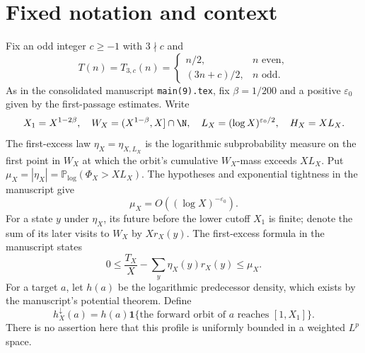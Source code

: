\providecommand{\ind}{\mathbf1}
\providecommand{\eps}{\varepsilon}
\section{Fixed notation and context}
Fix an odd integer $c\ge-1$ with $3\nmid c$ and
\[
 T(n)=T_{3,c}(n)=\begin{cases}n/2,&n\text{ even},\\(3n+c)/2,&n\text{ odd}.\end{cases}
\]
As in the consolidated manuscript \texttt{main(9).tex}, fix
$\beta=1/200$ and a positive $\eps_0$ given by the first-passage
estimates.  Write
\[
 X_1=X^{1-2\beta},\quad W_X=(X^{1-\beta},X]\cap\N,\quad
 L_X=(\log X)^{\eps_0/2},\quad H_X=XL_X.
\]
The first-excess law $\eta_X=\eta_{X,L_X}$ is the logarithmic
subprobability measure on the first point in $W_X$ at which the orbit's
cumulative $W_X$-mass exceeds $XL_X$.  Put
$\mu_X=|\eta_X|=\mathbb P_{\log}(\Phi_X>XL_X)$.
The hypotheses and exponential tightness in the manuscript give
\begin{equation}\label{eq:mu}
 \mu_X=O((\log X)^{-\eps_0}).
\end{equation}
For a state $y$ under $\eta_X$, its future before the lower cutoff
$X_1$ is finite; denote the sum of its later visits to $W_X$ by
$Xr_X(y)$.  The first-excess formula in the manuscript states
\begin{equation}\label{eq:excess}
 0\le \frac{T_X}{X}-\sum_y\eta_X(y)r_X(y)\le\mu_X.
\end{equation}
For a target $a$, let $h(a)$ be the logarithmic predecessor density,
which exists by the manuscript's potential theorem.  Define
\[
 h_X^{\downarrow}(a)=h(a)\ind\{\text{the forward orbit of }a
 \text{ reaches }[1,X_1]\}.
\]
There is no assertion here that this profile is uniformly bounded
in a weighted $L^p$ space.

